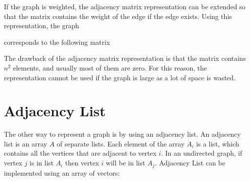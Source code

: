 \documentclass[twoside,12pt,a4paper,english]{book}
\theoremstyle{definition}
\theoremstyle{problemstyle}
\theoremstyle{problemstyle}
\theoremstyle{problemstyle}
\begin{document}
If the graph is weighted, the adjacency matrix representation can be extended
so that the matrix contains the weight of the edge if the edge exists. Using this
representation, the graph

\begin{center}
\end{center}

corresponds to the following matrix

\begin{center}
\end{center}

The drawback of the adjacency matrix representation is that the matrix
contains $n^2$ elements, and usually most of them are zero. For this reason, the
representation cannot be used if the graph is large as a lot of space is wasted.

\section{Adjacency List}

The other way to represent a graph is by using an adjacency list. An adjacency list is an array $A$ of separate lists. Each element of the array $A_i$ is a list, which contains all the vertices that are adjacent to vertex $i$. In an undirected graph, if vertex $j$ is in list $A_i$ then vertex $i$ will be in list $A_j$. Adjacency List can be implemented using an array of vectors:
\end{document}
